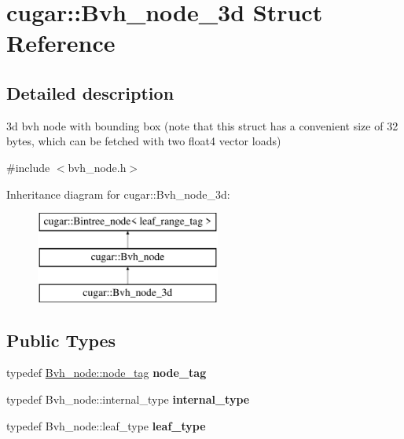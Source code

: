 \hypertarget{structcugar_1_1_bvh__node__3d}{}\section{cugar\+:\+:Bvh\+\_\+node\+\_\+3d Struct Reference}
\label{structcugar_1_1_bvh__node__3d}


\subsection{Detailed description}
3d bvh node with bounding box (note that this struct has a convenient size of 32 bytes, which can be fetched with two float4 vector loads) 

{\ttfamily \#include $<$bvh\+\_\+node.\+h$>$}

Inheritance diagram for cugar\+:\+:Bvh\+\_\+node\+\_\+3d\+:\begin{figure}[H]
\begin{center}
\leavevmode
\includegraphics[height=3.000000cm]{structcugar_1_1_bvh__node__3d}
\end{center}
\end{figure}
\subsection*{Public Types}
\begin{DoxyCompactItemize}
\item 
\mbox{\label{structcugar_1_1_bvh__node__3d_aacec14cb873e98a6f4c7d71a23172520}} 
typedef \hyperlink{structcugar_1_1leaf__range__tag}{Bvh\+\_\+node\+::node\+\_\+tag} {\bfseries node\+\_\+tag}
\item 
\mbox{\label{structcugar_1_1_bvh__node__3d_a2edcfbe5625e457b0be8da7c661b441f}} 
typedef Bvh\+\_\+node\+::internal\+\_\+type {\bfseries internal\+\_\+type}
\item 
\mbox{\label{structcugar_1_1_bvh__node__3d_a502992c44b9d7f68d99f96c0bcbe2fd3}} 
typedef Bvh\+\_\+node\+::leaf\+\_\+type {\bfseries leaf\+\_\+type}
\end{DoxyCompactItemize}
